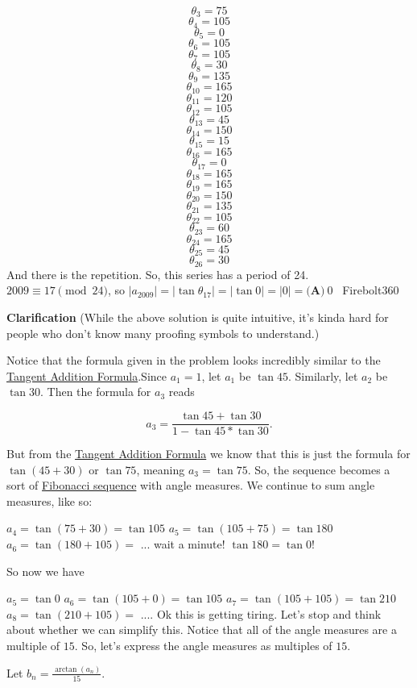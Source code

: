 \begin{enumerate}
 
 \[\theta_3=75\]
 \[\theta_4=105\]
 \[\theta_5=0\]
 \[\theta_6=105\]
 \[\theta_7=105\]
 \[\theta_8=30\]
 \[\theta_9=135\]
 \[\theta_{10}=165\]
 \[\theta_{11}=120\]
 \[\theta_{12}=105\]
 \[\theta_{13}=45\]
 \[\theta_{14}=150\]
 \[\theta_{15}=15\]
 \[\theta_{16}=165\]
 \[\theta_{17}=0\]
 \[\theta_{18}=165\]
 \[\theta_{19}=165\]
 \[\theta_{20}=150\]
 \[\theta_{21}=135\]
 \[\theta_{22}=105\]
 \[\theta_{23}=60\]
 \[\theta_{24}=165\]
 \[\theta_{25}=45\]
 \[\theta_{26}=30\]And there is the repetition. So, this series has a period of 24. $2009 \equiv 17 \pmod{24}$, so $|a_{2009}|=|\tan{\theta_{17}}|=|\tan{0}|=|0|= \boxed{\textbf{(A)}\ 0}$ ~Firebolt360

 \textbf{Clarification} (While the above solution is quite intuitive, it's kinda hard for people who don't know many proofing symbols to understand.)

 
Notice that the formula given in the problem looks incredibly similar to the \href{https://artofproblemsolving.com/wiki/index.php?title=Trigonometric\_identities\#Angle\_Addition/Subtraction\_Identities}{Tangent Addition Formula}.Since $a_1 = 1$, let $a_1$ be $\tan{45}$. Similarly, let $a_2$ be $\tan{30}$. Then the formula for $a_3$ reads

 


 
 \[a_3 = \frac {\tan{45} + \tan{30} }{1 - \tan{45}*\tan{30}}.\]

 
But from the \href{https://artofproblemsolving.com/wiki/index.php?title=Trigonometric\_identities\#Angle\_Addition/Subtraction\_Identities}{Tangent Addition Formula} we know that this is just the formula for $\tan{(45+30)}$ or $\tan{75}$, meaning $a_3 = \tan{75}$. So, the sequence becomes a sort of \href{https://artofproblemsolving.com/wiki/index.php?title=Fibonacci\_sequence}{Fibonacci sequence}  with angle measures. We continue to sum angle measures, like so:

 
$a_4 = \tan{(75+30)} = \tan{105}$
$a_5 = \tan{(105+75)} = \tan{180}$
$a_6 = \tan{(180+105)} =$ ... wait a minute! $\tan{180} = \tan{0}$!

 
So now we have

 
$a_5 = \tan{0}$
$a_6 = \tan{(105+0)} = \tan{105}$
$a_7 = \tan{(105+105)} = \tan{210}$
$a_8 = \tan{(210+105)} =$ .... Ok this is getting tiring. Let's stop and think about whether we can simplify this. Notice that all of the angle measures are a multiple of $15$. So, let's express the angle measures as multiples of $15$.

 
Let $b_n = \frac{\arctan{(a_n)}}{15}$.


\end{enumerate}
